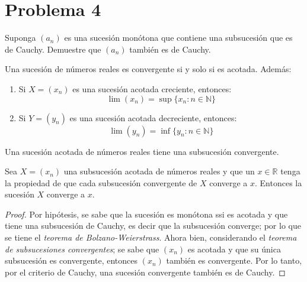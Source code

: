\documentclass[a4paper,12pt]{article}
\begin{document}
\section{Problema 4} Suponga $\left(a_{n}\right)$ es una sucesión monótona que contiene una subsucesión que es de Cauchy.
Demuestre que $\left(a_{n}\right)$ también es de Cauchy.
\begin{tcolorbox}[colback=gray!15,colframe=gray!1!gray,title=Teorema Convergencia Monótona]
Una sucesión de números reales es convergente si y solo si es acotada. Además: 
\begin{enumerate}
    \item Si $X=(x_n)$ es una sucesión acotada creciente, entonces: 
$$\lim(x_n)=\sup\{x_n:n\in\mathbb{N}\}$$
\item Si $Y=(y_n)$ es una sucesión acotada decreciente, entonces: 
$$\lim(y_n)=\inf\{y_n:n\in\mathbb{N}\}$$
\end{enumerate}
\end{tcolorbox}
\begin{tcolorbox}[colback=gray!15,colframe=gray!1!gray,title=Teorema de Bolzano-Weierstrass]
Una sucesión acotada de números reales tiene una subsucesión convergente.
\end{tcolorbox}
\begin{tcolorbox}[colback=gray!15,colframe=gray!1!gray,title=Teorema de subsucesiones convergentes]
Sea $X=(x_n)$ una subsucesión acotada de números reales y que un $x\in\mathbb{R}$ tenga la propiedad de que cada subsucesión convergente de $X$ converge a $x$. Entonces la sucesión $X$ converge a $x$.
\end{tcolorbox}
\begin{proof}
Por hipótesis, se sabe que la sucesión es monótona ssi es acotada y que tiene una subsucesión de Cauchy, es decir que la subsucesión converge; por lo que se tiene el \textit{teorema de Bolzano-Weierstrass}. Ahora bien, considerando el \textit{teorema de subsucesiones convergentes}; se sabe que $(x_n)$ es acotada y que su única subsucesión es convergente, entonces $(x_n)$ también es convergente. Por lo tanto, por el criterio de Cauchy, una sucesión convergente también es de Cauchy. 
\end{proof}
\end{document}
